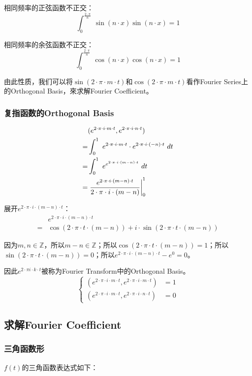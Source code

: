 相同频率的正弦函数不正交：
$$
	\int_0^{\frac{2\cdot \pi}{n}}\ \sin(n\cdot x)\sin(n\cdot x)=1
$$

相同频率的余弦函数不正交：
$$
	\int_0^{\frac{2\cdot \pi}{n}}\ \cos(n\cdot x)\cos(n\cdot x)=1
$$

由此性质，我们可以将$\sin(2\cdot \pi\cdot m \cdot t)$和$\cos(2\cdot \pi\cdot m \cdot t)$看作Fourier Series上的Orthogonal Basis，來求解Fourier Coefficient。
\subsubsection{复指函数的Orthogonal Basis}
\begin{align*}
	  & (e^{2\cdot \pi\cdot i\cdot m\cdot t},e^{2\cdot \pi\cdot i\cdot n\cdot t})                      \\
	= & \int_0^1 \ e^{2\cdot \pi\cdot i\cdot m\cdot t}\cdot e^{2\cdot \pi\cdot i\cdot (-n)\cdot t}\ dt \\
	= & \int_0^1 \ e^{e^{2\cdot \pi\cdot i\cdot (m-n)\cdot t}}\ dt                                     \\
	= & \rsx{\frac{e^{2\cdot \pi\cdot i\cdot (m-n)\cdot t}}{2\cdot \pi \cdot i \cdot(m-n)}}_0^1
\end{align*}

展开$e^{2\cdot \pi\cdot i\cdot (m-n)\cdot t}$：
\begin{align*}
	  & e^{2\cdot \pi\cdot i\cdot (m-n)\cdot t}                                       \\
	= & \cos(2\cdot \pi \cdot t\cdot(m-n))+i \cdot \sin(2\cdot \pi \cdot t\cdot(m-n))
\end{align*}

因为$m,n\in \mathbb{Z}$，所以$m-n\in \mathbb{Z}$；所以$\cos(2\cdot \pi \cdot t\cdot(m-n))=1$；所以$\sin(2\cdot \pi \cdot t\cdot(m-n))=0$；所以$e^{2\cdot \pi\cdot i\cdot (m-n)\cdot t}-e^0=0$。

因此$e^{2\cdot \pi i\cdot k \cdot t}$被称为Fourier Transform中的Orthogonal Basis。
$$
	\begin{cases}
		(e^{2\cdot \pi\cdot i\cdot m\cdot t},e^{2\cdot \pi\cdot i\cdot m\cdot t}) & =1 \\
		(e^{2\cdot \pi\cdot i\cdot m\cdot t},e^{2\cdot \pi\cdot i\cdot n\cdot t}) & =0
	\end{cases}
$$
\subsection{求解Fourier Coefficient}
\subsubsection{三角函数形}
$f(t)$的三角函数表达式如下：

